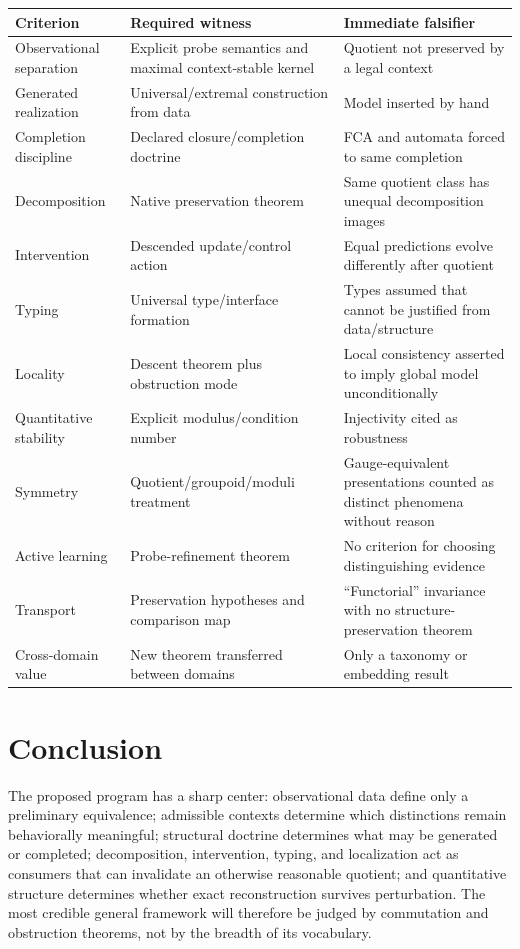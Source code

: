 \documentclass[11pt]{article}
\theoremstyle{definition}
\theoremstyle{remark}
\begin{document}
\begin{center}
\begin{tabularx}{\textwidth}{>{\raggedright\arraybackslash}p{}X>{\raggedright\arraybackslash}p{}}
\toprule
Criterion & Required witness & Immediate falsifier \\
\midrule
Observational separation & Explicit probe semantics and maximal context-stable kernel & Quotient not preserved by a legal context \\
Generated realization & Universal/extremal construction from data & Model inserted by hand \\
Completion discipline & Declared closure/completion doctrine & FCA and automata forced to same completion \\
Decomposition & Native preservation theorem & Same quotient class has unequal decomposition images \\
Intervention & Descended update/control action & Equal predictions evolve differently after quotient \\
Typing & Universal type/interface formation & Types assumed that cannot be justified from data/structure \\
Locality & Descent theorem plus obstruction mode & Local consistency asserted to imply global model unconditionally \\
Quantitative stability & Explicit modulus/condition number & Injectivity cited as robustness \\
Symmetry & Quotient/groupoid/moduli treatment & Gauge-equivalent presentations counted as distinct phenomena without reason \\
Active learning & Probe-refinement theorem & No criterion for choosing distinguishing evidence \\
Transport & Preservation hypotheses and comparison map & ``Functorial'' invariance with no structure-preservation theorem \\
Cross-domain value & New theorem transferred between domains & Only a taxonomy or embedding result \\
\bottomrule
\end{tabularx}
\end{center}

\section{Conclusion}

The proposed program has a sharp center: observational data define only a preliminary equivalence; admissible contexts determine which distinctions remain behaviorally meaningful; structural doctrine determines what may be generated or completed; decomposition, intervention, typing, and localization act as consumers that can invalidate an otherwise reasonable quotient; and quantitative structure determines whether exact reconstruction survives perturbation. The most credible general framework will therefore be judged by commutation and obstruction theorems, not by the breadth of its vocabulary.
\end{document}
